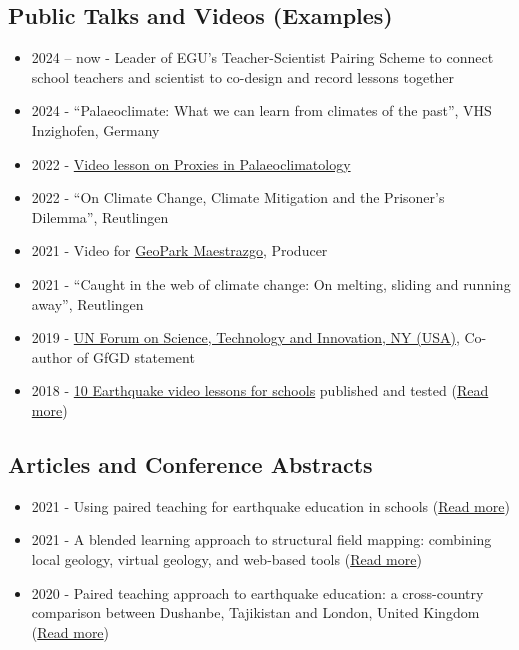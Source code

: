 \documentclass[
  letterpaper,
  DIV=11,
  numbers=noendperiod]{scrartcl}
\providecommand{\tightlist}{%
  \setlength{\itemsep}{0pt}\setlength{\parskip}{0pt}}
\begin{document}
\subsection{Public Talks and Videos
(Examples)}\label{public-talks-and-videos-examples}

\begin{itemize}
\tightlist
\item
  2024 -- now - Leader of EGU's Teacher-Scientist Pairing Scheme to
  connect school teachers and scientist to co-design and record lessons
  together
\item
  2024 - ``Palaeoclimate: What we can learn from climates of the past'',
  VHS Inzighofen, Germany
\item
  2022 - \href{https://www.youtube.com/watch?v=_A0O8qacHok}{Video lesson
  on Proxies in Palaeoclimatology}
\item
  2022 - ``On Climate Change, Climate Mitigation and the Prisoner's
  Dilemma'', Reutlingen
\item
  2021 - Video for
  \href{https://geoparques.es/en/portfolio_page/maestrazgo-en/}{GeoPark
  Maestrazgo}, Producer
\item
  2021 - ``Caught in the web of climate change: On melting, sliding and
  running away'', Reutlingen
\item
  2019 -
  \href{https://drive.google.com/file/d/1rpEx8PtRWS38KoznPGlGt7k911X1WrmS/view}{UN
  Forum on Science, Technology and Innovation, NY (USA)}, Co-author of
  GfGD statement
\item
  2018 - \href{https://parsquake.org/resources.html}{10 Earthquake video
  lessons for schools} published and tested
  (\href{https://doi.org/10.5194/gc-4-281-2021}{Read more})
\end{itemize}

\subsection{Articles and Conference
Abstracts}\label{articles-and-conference-abstracts}

\begin{itemize}
\tightlist
\item
  2021 - Using paired teaching for earthquake education in schools
  (\href{https://gc.copernicus.org/articles/4/281/2021/}{Read more})
\item
  2021 - A blended learning approach to structural field mapping:
  combining local geology, virtual geology, and web-based tools
  (\href{https://doi.org/10.5194/egusphere-egu21-3581}{Read more})
\item
  2020 - Paired teaching approach to earthquake education: a
  cross-country comparison between Dushanbe, Tajikistan and London,
  United Kingdom
  (\href{https://doi.org/10.5194/egusphere-egu2020-11230}{Read more})
\end{itemize}
\end{document}
